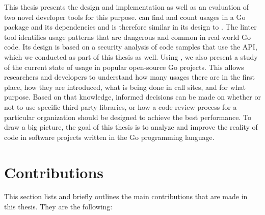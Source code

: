 This thesis presents the design and implementation as well as an evaluation of two novel developer tools for this
purpose.
\toolGeiger{} can find and count \unsafe{} usages in a Go package and its dependencies and is therefore similar in its
design to \toolCargoGeiger{}.
The linter tool \toolSafer{} identifies \unsafe{} usage patterns that are dangerous and common in real-world Go code.
Its design is based on a security analysis of code samples that use the \unsafe{} \acrshort{API}, which we conducted as
part of this thesis as well.
Using \toolGeiger{}, we also present a study of the current state of \unsafe{} usage in popular open-source Go projects.
This allows researchers and developers to understand how many usages there are in the first place, how they are
introduced, what is being done in \unsafe{} call sites, and for what purpose.
Based on that knowledge, informed decisions can be made on whether or not to use specific third-party libraries, or how
a code review process for a particular organization should be designed to achieve the best performance.
To draw a big picture, the goal of this thesis is to analyze and improve the reality of \unsafe{} code in software
projects written in the Go programming language.




\section{Contributions}\label{sec:introduction:contributions}

This section lists and briefly outlines the main contributions that are made in this thesis.
They are the following:

